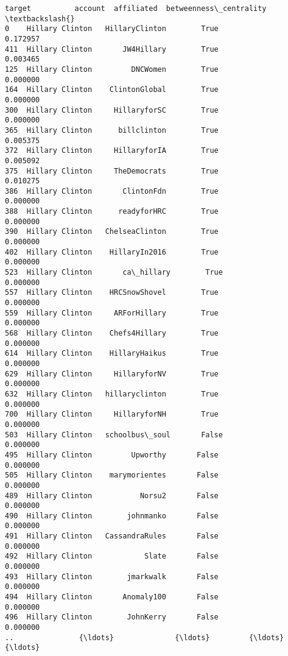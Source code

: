 \documentclass[11pt]{article}
\begin{document}
    \begin{Verbatim}[commandchars=\\\{\}]
              target          account  affiliated  betweenness\_centrality  \textbackslash{}
0    Hillary Clinton   HillaryClinton        True                0.172957   
411  Hillary Clinton       JW4Hillary        True                0.003465   
125  Hillary Clinton         DNCWomen        True                0.000000   
164  Hillary Clinton    ClintonGlobal        True                0.000000   
300  Hillary Clinton     HillaryforSC        True                0.000000   
365  Hillary Clinton      billclinton        True                0.005375   
372  Hillary Clinton     HillaryforIA        True                0.005092   
375  Hillary Clinton     TheDemocrats        True                0.010275   
386  Hillary Clinton       ClintonFdn        True                0.000000   
388  Hillary Clinton      readyforHRC        True                0.000000   
390  Hillary Clinton   ChelseaClinton        True                0.000000   
402  Hillary Clinton    HillaryIn2016        True                0.000000   
523  Hillary Clinton       ca\_hillary        True                0.000000   
557  Hillary Clinton    HRCSnowShovel        True                0.000000   
559  Hillary Clinton     ARForHillary        True                0.000000   
568  Hillary Clinton    Chefs4Hillary        True                0.000000   
614  Hillary Clinton    HillaryHaikus        True                0.000000   
629  Hillary Clinton     HillaryforNV        True                0.000000   
632  Hillary Clinton   hillaryclinton        True                0.000000   
700  Hillary Clinton     HillaryforNH        True                0.000000   
503  Hillary Clinton   schoolbus\_soul       False                0.000000   
495  Hillary Clinton         Upworthy       False                0.000000   
505  Hillary Clinton    marymorientes       False                0.000000   
489  Hillary Clinton           Norsu2       False                0.000000   
490  Hillary Clinton        johnmanko       False                0.000000   
491  Hillary Clinton   CassandraRules       False                0.000000   
492  Hillary Clinton            Slate       False                0.000000   
493  Hillary Clinton        jmarkwalk       False                0.000000   
494  Hillary Clinton       Anomaly100       False                0.000000   
496  Hillary Clinton        JohnKerry       False                0.000000   
..               {\ldots}              {\ldots}         {\ldots}                     {\ldots}   

\end{Verbatim}
\end{document}
